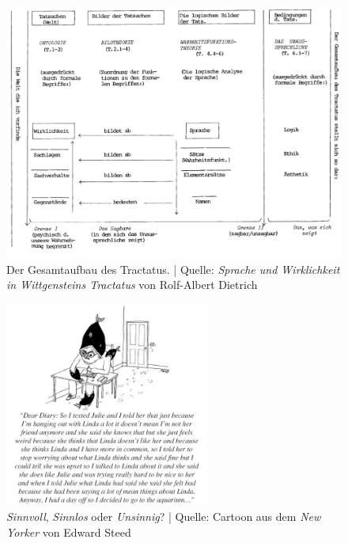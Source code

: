 \documentclass[emulatestandardclasses]{scrartcl}
\begin{document}
\begin{figure}[h]
	\centering
	\includegraphics[width=1\textwidth]{images/tractatus/tractatus-structur.png}
	\caption{Der Gesamtaufbau des Tractatus. | Quelle: \emph{Sprache und Wirklichkeit in Wittgensteins Tractatus} von Rolf-Albert Dietrich}
	\label{fig:struct}
\end{figure}
\begin{figure}[h]
	\centering
	\includegraphics[width=0.6\textwidth]{images/tractatus/newyorker}
	\caption{\emph{Sinnvoll}, \emph{Sinnlos} oder \emph{Unsinnig}? | Quelle: Cartoon aus dem \emph{New Yorker} von Edward Steed}
	\label{fig:newyorker}
\end{figure}


%
%
%


\end{document}
